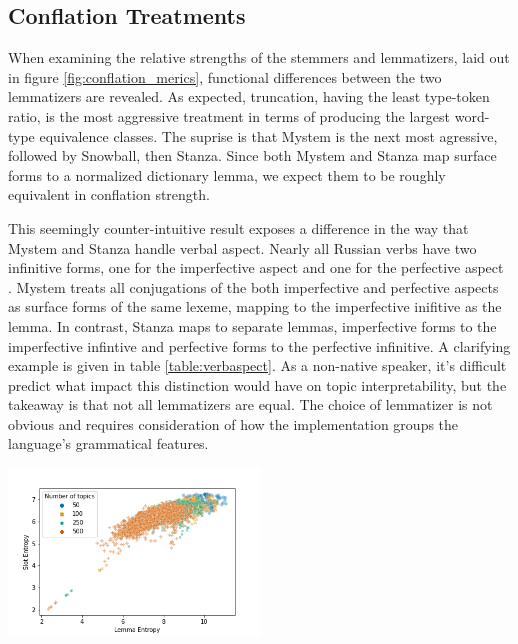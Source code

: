 \documentclass[11pt,a4paper]{article}
\begin{document}
\subsection{Conflation Treatments}

When examining the relative strengths of the stemmers and lemmatizers, laid out in figure \ref{fig:conflation_merics}, functional differences between the two lemmatizers are revealed. As expected, truncation, having the least type-token ratio, is the most aggressive treatment in terms of producing the largest word-type equivalence classes. The suprise is that Mystem is the next most agressive, followed by Snowball, then Stanza. Since both Mystem and Stanza map surface forms to a normalized dictionary lemma, we expect them to be roughly equivalent in conflation strength.

This seemingly counter-intuitive result exposes a difference in the way that Mystem and Stanza handle verbal aspect. Nearly all Russian verbs have two infinitive forms, one for the imperfective aspect and one for the perfective aspect \cite{wade2020comprehensive}. Mystem treats all conjugations of the both imperfective and perfective aspects as surface forms of the same lexeme, mapping to the imperfective inifitive as the lemma. In contrast, Stanza maps to separate lemmas, imperfective forms to the imperfective infintive and perfective forms to the perfective infinitive. A clarifying example is given in table \ref{table:verbaspect}. As a non-native speaker, it's difficult predict what impact this distinction would have on topic interpretability, but the takeaway is that not all lemmatizers are equal. The choice of lemmatizer is not obvious and requires consideration of how the implementation groups the language's grammatical features.

\begin{center}
    \includegraphics[width=0.5\textwidth]{lemma_slot_entropy_scatter.png}
    \label{fig:lemma_vs_slot_entropy}
\end{center}
\end{document}
